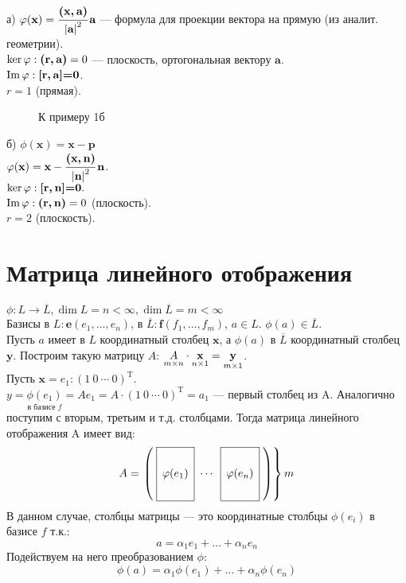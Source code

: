 \noindent а) $\phi(\textbf{x})=\cfrac{\textbf{(x,\,a)}}{\abs{\textbf{a}}^2}\,\textbf{a}$ --- формула для проекции вектора на прямую (из аналит. геометрии).\\
$\ker \phi : \textbf{(r,\,a)}=0$ --- плоскость, ортогональная вектору $\textbf{a}$.\\
$\im \phi: \textbf{[r,\,a]=0}$.\\
$r = 1$ (прямая).

\begin{wrapfigure}{r}{0.27\linewidth}
	\def\svgwidth{5cm} %
	
	\caption{К примеру 1б}
	\label{...}
	\vspace{-10cm}
\end{wrapfigure}

\noindent б) $\phi(\textbf{x})=\textbf{x}-\textbf{p}$\\
$\phi(\textbf{x})=\textbf{x}-\cfrac{\textbf{(\textbf{x},\,\textbf{n})}}{\abs{\textbf{n}}^2}\,\textbf{n}$.\\
$\ker \phi: \textbf{[r,\,n]=0}.$\\
$\im \phi: \textbf{(r,\,n)}=0$ (плоскость).\\
$r=2$ (плоскость).

\section{Матрица линейного отображения}
\noindent$\phi: L\rightarrow\overline{L}, \dim L=n<\infty, \dim \overline{L}=m<\infty$\\
Базисы в $L: \textbf{e} (e_1,\dots,e_n)$, в $\overline{L}: \textbf{f} (f_1,\dots,f_m)$, $a \in L$. $\phi(a) \in \overline{L}$.\\
Пусть $a$ имеет в $L$ координатный столбец $\textbf{x}$, а $\phi(a)$ в $\overline{L}$ координатный столбец $\textbf{y}$. Построим такую матрицу $A$: $\underset{m\times n} A\cdot \underset{n\times 1}{\text{\textbf{x}}}=\underset{m\times 1}{\text{\textbf{y}}}$.\\
Пусть $\textbf{x}=e_1: (1\ 0\ \cdots\ 0)^{\text{T}}$.\\
$y=\underset{\text{в базисе $f$}}{\phi(e_1)}=Ae_1=A\cdot (1\ 0\ \cdots\ 0)^{\text{T}}=a_1$ --- первый столбец из A. Аналогично поступим с вторым, третьим и т.д. столбцами. Тогда матрица линейного отображения A имеет вид:
$$A=
\left.\left(\hspace{1mm}
\begin{array}{|c|c|c|}
\cline{1-1} \cline{3-3}
\multirow{4}{*}{$\phi(e_1)$} & \multirow{4}{*}{$\cdots$} & \multirow{4}{*}{$\phi(e_n)$} \\
&                           &                              \\
&                           &                              \\
&                           &                              \\ \cline{1-1} \cline{3-3} 
\end{array}\hspace{1mm}\right) \right\}m
$$
В данном случае, столбцы матрицы --- это координатные столбцы $\phi(e_i)$ в базисе $f$ т.к.:
$$
a=\alpha_1 e_1+\dots+\alpha_n e_n
$$
Подействуем на него преобразованием $\phi$:
$$
\phi(a)=\alpha_1 \phi(e_1)+\dots+\alpha_n \phi(e_n)
$$

